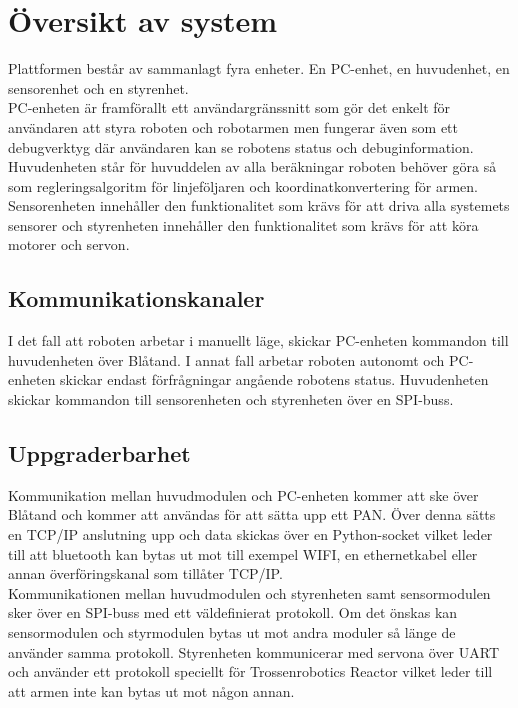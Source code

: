 \section{Översikt av system}
Plattformen består av sammanlagt fyra enheter. En PC-enhet, en huvudenhet, en sensorenhet och en styrenhet. \\
PC-enheten är framförallt ett användargränssnitt som gör det enkelt för användaren att styra roboten och robotarmen men fungerar även som ett debugverktyg där användaren kan se robotens status och debuginformation. Huvudenheten står för huvuddelen av alla beräkningar roboten behöver göra så som regleringsalgoritm för linjeföljaren och koordinatkonvertering för armen. Sensorenheten innehåller den funktionalitet som krävs för att driva alla systemets sensorer och styrenheten innehåller den funktionalitet som krävs för att köra motorer och servon.

\subsection{Kommunikationskanaler}
I det fall att roboten arbetar i manuellt läge, skickar PC-enheten kommandon till huvudenheten över Blåtand. I annat fall arbetar roboten autonomt och PC-enheten skickar endast förfrågningar angående robotens status. Huvudenheten skickar kommandon till sensorenheten och styrenheten över en SPI-buss.

\subsection{Uppgraderbarhet}
Kommunikation mellan huvudmodulen och PC-enheten kommer att ske över Blåtand och kommer att användas för att sätta upp ett PAN. Över denna sätts en TCP/IP anslutning upp och data skickas över en Python-socket vilket leder till att bluetooth kan bytas ut mot till exempel WIFI, en ethernetkabel eller annan överföringskanal som tillåter TCP/IP. \\
Kommunikationen mellan huvudmodulen och styrenheten samt sensormodulen sker över en SPI-buss med ett väldefinierat protokoll. Om det önskas kan sensormodulen och styrmodulen bytas ut mot andra moduler så länge de använder samma protokoll. Styrenheten kommunicerar med servona över UART och använder ett protokoll speciellt för Trossenrobotics Reactor vilket leder till att armen inte kan bytas ut mot någon annan.

